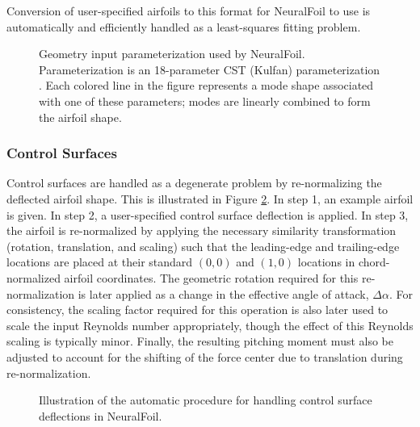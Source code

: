 \documentclass[journal]{new-aiaa}
\begin{document}
Conversion of user-specified airfoils to this format for NeuralFoil to use is automatically and efficiently handled as a least-squares fitting problem.

\begin{figure}[h]
    \centering
    \caption{Geometry input parameterization used by NeuralFoil. Parameterization is an 18-parameter CST (Kulfan) parameterization \cite{kulfanUniversalParametricGeometry2008,kulfanModificationCSTAirfoil2020, mastersGeometricComparisonAerofoil2017}. Each colored line in the figure represents a mode shape associated with one of these parameters; modes are linearly combined to form the airfoil shape.}
    \label{fig:neuralfoil_parameterization}
\end{figure}

\subsubsection{Control Surfaces}
\label{sec:control-surfaces}

Control surfaces are handled as a degenerate problem by re-normalizing the deflected airfoil shape. This is illustrated in Figure \ref{fig:control_surface_decomposition}. In step 1, an example airfoil is given. In step 2, a user-specified control surface deflection is applied. In step 3, the airfoil is re-normalized by applying the necessary similarity transformation (rotation, translation, and scaling) such that the leading-edge and trailing-edge locations are placed at their standard $(0, 0)$ and $(1, 0)$ locations in chord-normalized airfoil coordinates. The geometric rotation required for this re-normalization is later applied as a change in the effective angle of attack, $\Delta\alpha$. For consistency, the scaling factor required for this operation is also later used to scale the input Reynolds number appropriately, though the effect of this Reynolds scaling is typically minor. Finally, the resulting pitching moment must also be adjusted to account for the shifting of the force center due to translation during re-normalization.

\begin{figure}[h]
    \centering
    
    \caption{Illustration of the automatic procedure for handling control surface deflections in NeuralFoil.}
    \label{fig:control_surface_decomposition}
\end{figure}
\end{document}
